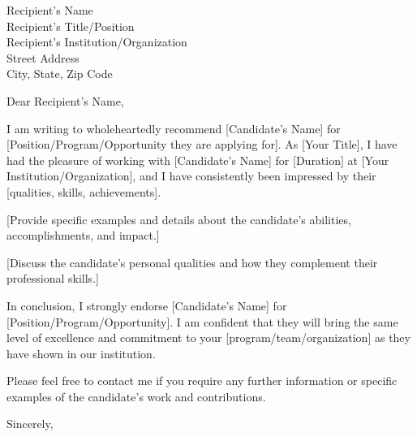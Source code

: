 \documentclass{letter}
\date{\today}
\begin{document}
\begin{letter}{Recipient's Name \\ Recipient's Title/Position \\ Recipient's Institution/Organization \\ Street Address \\ City, State, Zip Code}

\opening{Dear Recipient's Name,}

I am writing to wholeheartedly recommend [Candidate's Name] for [Position/Program/Opportunity they are applying for]. As [Your Title], I have had the pleasure of working with [Candidate's Name] for [Duration] at [Your Institution/Organization], and I have consistently been impressed by their [qualities, skills, achievements].

[Provide specific examples and details about the candidate's abilities, accomplishments, and impact.]

[Discuss the candidate's personal qualities and how they complement their professional skills.]

In conclusion, I strongly endorse [Candidate's Name] for [Position/Program/Opportunity]. I am confident that they will bring the same level of excellence and commitment to your [program/team/organization] as they have shown in our institution.

Please feel free to contact me if you require any further information or specific examples of the candidate's work and contributions.

\closing{Sincerely,}


\end{letter}
\end{document}
